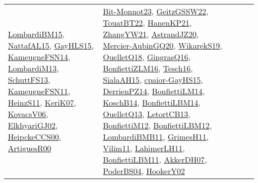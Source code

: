 {\begin{longtable}{lp{3cm}>{\raggedright}p{6cm}>{\raggedright}p{6cm}p{8cm}}
\href{papers/LombardiBM15.pdf}{LombardiBM15}\cite{LombardiBM15}, \href{articles/NattafAL15.pdf}{NattafAL15}\cite{NattafAL15}, \href{papers/GayHLS15.pdf}{GayHLS15}\cite{GayHLS15}, \href{articles/KameugneFSN14.pdf}{KameugneFSN14}\cite{KameugneFSN14}, \href{papers/LombardiM13.pdf}{LombardiM13}\cite{LombardiM13}, \href{papers/SchuttFS13.pdf}{SchuttFS13}\cite{SchuttFS13}, \href{papers/KameugneFSN11.pdf}{KameugneFSN11}\cite{KameugneFSN11}, \href{papers/HeinzS11.pdf}{HeinzS11}\cite{HeinzS11}, \href{papers/KeriK07.pdf}{KeriK07}\cite{KeriK07}, \href{papers/KovacsV06.pdf}{KovacsV06}\cite{KovacsV06}, \href{papers/ElkhyariGJ02.pdf}{ElkhyariGJ02}\cite{ElkhyariGJ02}, \href{articles/HeipckeCCS00.pdf}{HeipckeCCS00}\cite{HeipckeCCS00}, \href{articles/ArtiguesR00.pdf}{ArtiguesR00}\cite{ArtiguesR00} & \href{papers/Bit-Monnot23.pdf}{Bit-Monnot23}\cite{Bit-Monnot23}, \href{papers/GeitzGSSW22.pdf}{GeitzGSSW22}\cite{GeitzGSSW22}, \href{papers/TouatBT22.pdf}{TouatBT22}\cite{TouatBT22}, \href{papers/HanenKP21.pdf}{HanenKP21}\cite{HanenKP21}, \href{articles/ZhangYW21.pdf}{ZhangYW21}\cite{ZhangYW21}, \href{articles/AstrandJZ20.pdf}{AstrandJZ20}\cite{AstrandJZ20}, \href{papers/Mercier-AubinGQ20.pdf}{Mercier-AubinGQ20}\cite{Mercier-AubinGQ20}, \href{articles/WikarekS19.pdf}{WikarekS19}\cite{WikarekS19}, \href{papers/OuelletQ18.pdf}{OuelletQ18}\cite{OuelletQ18}, \href{papers/GingrasQ16.pdf}{GingrasQ16}\cite{GingrasQ16}, \href{papers/BonfiettiZLM16.pdf}{BonfiettiZLM16}\cite{BonfiettiZLM16}, \href{papers/Tesch16.pdf}{Tesch16}\cite{Tesch16}, \href{papers/SialaAH15.pdf}{SialaAH15}\cite{SialaAH15}, \href{papers/cpaior-GayHS15.pdf}{cpaior-GayHS15}\cite{cpaior-GayHS15}, \href{papers/DerrienPZ14.pdf}{DerrienPZ14}\cite{DerrienPZ14}, \href{papers/BonfiettiLM14.pdf}{BonfiettiLM14}\cite{BonfiettiLM14}, \href{papers/KoschB14.pdf}{KoschB14}\cite{KoschB14}, \href{articles/BonfiettiLBM14.pdf}{BonfiettiLBM14}\cite{BonfiettiLBM14}, \href{papers/OuelletQ13.pdf}{OuelletQ13}\cite{OuelletQ13}, \href{papers/LetortCB13.pdf}{LetortCB13}\cite{LetortCB13}, \href{papers/BonfiettiM12.pdf}{BonfiettiM12}\cite{BonfiettiM12}, \href{papers/BonfiettiLBM12.pdf}{BonfiettiLBM12}\cite{BonfiettiLBM12}, \href{papers/LombardiBMB11.pdf}{LombardiBMB11}\cite{LombardiBMB11}, \href{papers/GrimesH11.pdf}{GrimesH11}\cite{GrimesH11}, \href{papers/Vilim11.pdf}{Vilim11}\cite{Vilim11}, \href{papers/LahimerLH11.pdf}{LahimerLH11}\cite{LahimerLH11}, \href{papers/BonfiettiLBM11.pdf}{BonfiettiLBM11}\cite{BonfiettiLBM11}, \href{papers/AkkerDH07.pdf}{AkkerDH07}\cite{AkkerDH07}, \href{articles/PoderBS04.pdf}{PoderBS04}\cite{PoderBS04}, \href{papers/HookerY02.pdf}{HookerY02}\cite{HookerY02}\\

\end{longtable}}
